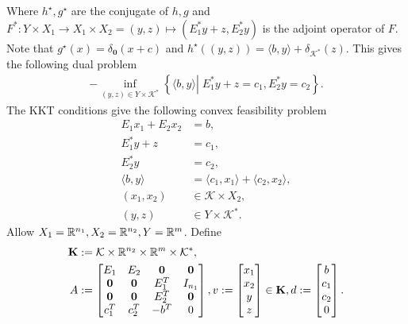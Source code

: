 \documentclass[12pt]{report}
\begin{document}
            Where $h^\star, g^\star$ are the conjugate of $h, g$ and $F^*: Y\times X_1 \rightarrow X_1 \times X_2 = (y, z)\mapsto (E_1^*y + z, E_2^*y)$ is the adjoint operator of $F$. 
            Note that $g^\star(x) = \delta_{\mathbf 0}(x + c)$ and $h^\star((y, z)) = \langle b, y\rangle + \delta_{\mathcal K^*}(z)$. 
            This gives the following dual problem 
            \begin{align*}
                - \inf_{(y, z) \in Y \times \mathcal K^*} \left\lbrace
                    \langle b, y\rangle 
                    \left | \;
                        E_1^*y + z = c_1, 
                        E^*_2y = c_2
                    \right.
                \right\rbrace. 
            \end{align*}
            The KKT conditions give the following convex feasibility problem 
            \begin{align*}
                E_1 x_1 + E_2 x_2 &= b, \\
                E_1^* y + z &= c_1, \\
                E_2^* y &= c_2, \\
                \langle b, y\rangle &= \langle c_1, x_1\rangle + \langle c_2, x_2\rangle, \\
                (x_1, x_2) &\in \mathcal K \times X_2, \\
                (y, z) &\in Y \times \mathcal K^*.
            \end{align*}
            Allow $X_1 = \mathbb R^{n_1}, X_2 = \mathbb R^{n_2}, Y = \mathbb R^m$. 
            Define 
            \begin{align*}
                \mathbf K &:= \mathcal K \times \mathbb R^{n_2} \times \mathbb R^m \times \mathcal K^*, 
                \\
                A &:= \begin{bmatrix}
                    E_1 & E_2 & \mathbf 0 & \mathbf 0
                    \\
                    \mathbf 0 &\mathbf 0  & E_1^T & I_{n_1}
                    \\
                    \mathbf 0 &\mathbf 0  & E_2^T & \mathbf 0
                    \\
                    c_1^T & c_2^T & - b^T & 0
                \end{bmatrix}, 
                v := 
                \begin{bmatrix}
                    x_1\\ x_2 \\ y \\ z \\
                \end{bmatrix} \in \mathbf K, 
                d := 
                \begin{bmatrix}
                    b \\ c_1 \\ c_2 \\ 0
                \end{bmatrix}. 
            \end{align*}
\end{document}

